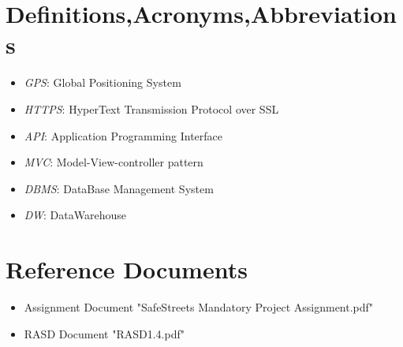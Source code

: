 \documentclass[a4paper]{report}
\begin{document}
\section{Definitions,Acronyms,Abbreviations}
\begin{itemize}
\item \textit{GPS}: Global Positioning System
\item \textit{HTTPS}: HyperText Transmission Protocol over SSL
\item \textit{API}: Application Programming Interface
\item \textit{MVC}: Model-View-controller pattern
\item \textit{DBMS}: DataBase Management System
\item \textit{DW}: DataWarehouse
\end{itemize}
\section{Reference Documents}
\begin{itemize}
\item Assignment Document "SafeStreets Mandatory Project Assignment.pdf"
\item RASD Document "RASD1.4.pdf"
\end{itemize}
\end{document}
